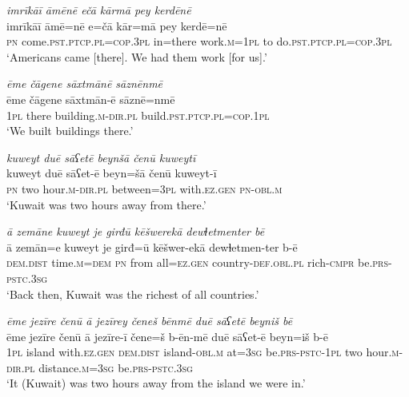 \ea \label{ŽM.39}
\textit{imrīkāī āmēnē ečā kārmā pey kerdēnē} \\ 
\gll imrīkāī āmē=nē e=čā kār=mā pey kerdē=nē \\ 
 \textsc{pn} come\textsc{.pst}\textsc{.ptcp}\textsc{.pl}\textsc{=cop}\textsc{.3pl} in=there work\textsc{.m}\textsc{=\textsc{1pl}} to do\textsc{.pst}\textsc{.ptcp}\textsc{.pl}\textsc{=cop}\textsc{.3pl} \\ 
\glt `Americans came [there]. We had them work [for us].'
\z 
 
\ea \label{ŽM.40}
\textit{ēme čāgene sāxtmānē sāznēnmē} \\ 
\gll ēme čāgene sāxtmān-ē sāznē=nmē \\ 
 \textsc{1pl} there building\textsc{.m}\textsc{-dir}\textsc{.pl} build\textsc{.pst}\textsc{.ptcp}\textsc{.pl}\textsc{=cop}\textsc{.\textsc{1pl}} \\ 
\glt `We built buildings there.'
\z 
 
\ea \label{ŽM.41}
\textit{kuweyt duē sāʕetē beynšā čenū kuweytī} \\ 
\gll kuweyt duē sāʕet-ē beyn=šā čenū kuweyt-ī \\ 
 \textsc{pn} two hour\textsc{.m}\textsc{-dir}\textsc{.pl} between\textsc{=3pl} with\textsc{\textsc{.ez}.gen} \textsc{pn}\textsc{-obl}\textsc{.m} \\ 
\glt `Kuwait was two hours away from there.'
\z 
 
\ea \label{ŽM.43}
\textit{ā zemāne kuweyt je girđū kēšwerekā dewɫetmenter bē} \\ 
\gll ā zemān=e kuweyt je girđ=ū kēšwer-ekā dewɫetmen-ter b-ē \\ 
 \textsc{dem.dist} time\textsc{.m}\textsc{=dem} \textsc{pn} from all\textsc{=ez.gen} country\textsc{-def}\textsc{.obl}\textsc{.pl} rich\textsc{-cmpr} be\textsc{.prs}\textsc{-pstc}\textsc{.3sg} \\ 
\glt `Back then, Kuwait was the richest of all countries.'
\z 
 
\ea \label{ŽM.45}
\textit{ēme jezīre čenū ā jezīrey čeneš bēnmē duē sāʕetē beyniš bē} \\ 
\gll ēme jezīre čenū ā jezīre-ī čene=š b-ēn-mē duē sāʕet-ē beyn=iš b-ē \\ 
 \textsc{1pl} island with\textsc{\textsc{.ez}.gen} \textsc{dem.dist} island\textsc{-obl}\textsc{.m} at\textsc{=3sg} be\textsc{.prs}\textsc{-pstc}\textsc{-\textsc{1pl}} two hour\textsc{.m}\textsc{-dir}\textsc{.pl} distance\textsc{.m}\textsc{=3sg} be\textsc{.prs}\textsc{-pstc}\textsc{.3sg} \\ 
\glt `It (Kuwait) was two hours away from the island we were in.'
\z 
 
